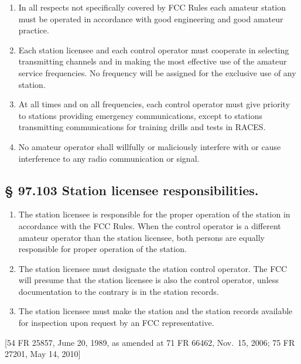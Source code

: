 \documentclass[
  letterpaper,
  DIV=11,
  numbers=noendperiod]{scrreport}
\begin{document}
\begin{enumerate}
\def\labelenumi{(\alph{enumi})}
\item
  In all respects not specifically covered by FCC Rules each amateur
  station must be operated in accordance with good engineering and good
  amateur practice.
\item
  Each station licensee and each control operator must cooperate in
  selecting transmitting channels and in making the most effective use
  of the amateur service frequencies. No frequency will be assigned for
  the exclusive use of any station.
\item
  At all times and on all frequencies, each control operator must give
  priority to stations providing emergency communications, except to
  stations transmitting communications for training drills and tests in
  RACES.
\item
  No amateur operator shall willfully or maliciously interfere with or
  cause interference to any radio communication or signal.
\end{enumerate}

\hypertarget{station-licensee-responsibilities.}{%
\subsection*{§ 97.103 Station licensee
responsibilities.}\label{station-licensee-responsibilities.}}

\begin{enumerate}
\def\labelenumi{(\alph{enumi})}
\item
  The station licensee is responsible for the proper operation of the
  station in accordance with the FCC Rules. When the control operator is
  a different amateur operator than the station licensee, both persons
  are equally responsible for proper operation of the station.
\item
  The station licensee must designate the station control operator. The
  FCC will presume that the station licensee is also the control
  operator, unless documentation to the contrary is in the station
  records.
\item
  The station licensee must make the station and the station records
  available for inspection upon request by an FCC representative.
\end{enumerate}

{[}54 FR 25857, June 20, 1989, as amended at 71 FR 66462, Nov.~15, 2006;
75 FR 27201, May 14, 2010{]}
\end{document}
